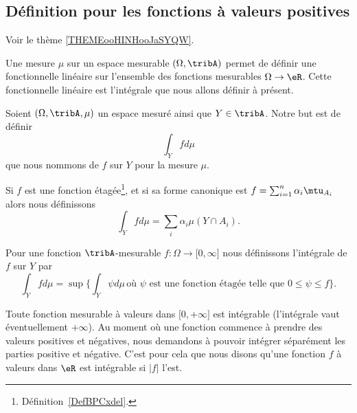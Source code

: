 \subsection{Définition pour les fonctions à valeurs positives}

Voir le thème \ref{THEMEooHINHooJaSYQW}.

Une mesure \( \mu\) sur un espace mesurable \( (\Omega,\tribA)\) permet de définir une fonctionnelle linéaire sur l'ensemble des fonctions mesurables \( \Omega\to \eR\). Cette fonctionnelle linéaire est l'intégrale que nous allons définir à présent.

\begin{definition}  \label{DefTVOooleEst}
	Soient \( (\Omega,\tribA,\mu)\) un espace mesuré ainsi que \( Y\in\tribA\). Notre but est de définir
	\begin{equation}
		\int_Yfd\mu
	\end{equation}
	que nous nommons  de \( f\) sur \( Y\) pour la mesure \( \mu\).
	\begin{subproof}
		Si \( f\) est une fonction étagée\footnote{Définition~\ref{DefBPCxdel}.}, et si sa forme canonique est \( f=\sum_{i=1}^n\alpha_i\mtu_{A_i}\) alors nous définissons
		\begin{equation}        \label{EqooGAFMooZLzjPs}
			\int_Yfd\mu=\sum_i\alpha_i\mu(Y\cap A_i).
		\end{equation}

		Pour une fonction \( \tribA\)-mesurable \( f\colon \Omega\to \mathopen[ 0 , \infty \mathclose]\) nous définissons l'intégrale de \( f\) sur \( Y\) par
		\begin{equation}        \label{EqDefintYfdmu}
			\int_Yfd\mu=\sup\Big\{ \int_Y\psi d\mu\,\text{où } \psi\text{ est une fonction étagée telle que } 0\leq \psi\leq f \Big\}.
		\end{equation}

	\end{subproof}
\end{definition}

\begin{remark}
	Toute fonction mesurable à valeurs dans \(  \mathopen[ 0 , +\infty \mathclose]   \) est intégrable (l'intégrale vaut éventuellement \( +\infty\)). Au moment où une fonction commence à prendre des valeurs positives et négatives, nous demandons à pouvoir intégrer séparément les parties positive et négative. C'est pour cela que nous disons qu'une fonction \( f\) à valeurs dans \( \eR\) est intégrable si \( | f |\) l'est.
\end{remark}

